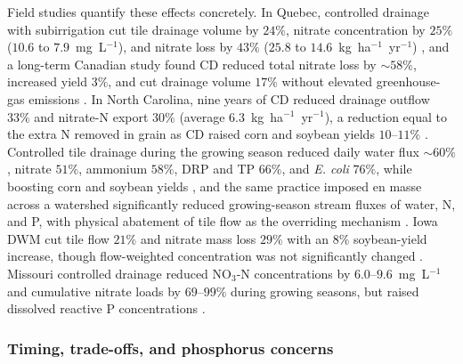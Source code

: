 \documentclass[11pt]{article}
\begin{document}
Field studies quantify these effects concretely. In Quebec, controlled
drainage with subirrigation cut tile drainage volume by $24\%$, nitrate
concentration by $25\%$ ($10.6$ to $7.9$~mg~L$^{-1}$), and nitrate loss by
$43\%$ ($25.8$ to $14.6$~kg~ha$^{-1}$~yr$^{-1}$) \parencite{Ng2000}, and a
long-term Canadian study found CD reduced total nitrate loss by $\sim58\%$,
increased yield $3\%$, and cut drainage volume $17\%$ without elevated
greenhouse-gas emissions \parencite{Madramootoo2024}. In North Carolina,
nine years of CD reduced drainage outflow $33\%$ and nitrate-N export
$30\%$ (average $6.3$~kg~ha$^{-1}$~yr$^{-1}$), a reduction equal to the
extra N removed in grain as CD raised corn and soybean yields $10$--$11\%$
\parencite{Poole2018}. Controlled tile drainage during the growing season
reduced daily water flux $\sim60\%$, nitrate $51\%$, ammonium $58\%$, DRP
and TP $66\%$, and \emph{E. coli} $76\%$, while boosting corn and soybean
yields \parencite{Sunohara2016}, and the same practice imposed en masse
across a watershed significantly reduced growing-season stream fluxes of
water, N, and P, with physical abatement of tile flow as the overriding
mechanism \parencite{Sunohara2015}. Iowa DWM cut tile flow $21\%$ and
nitrate mass loss $29\%$ with an $8\%$ soybean-yield increase, though
flow-weighted concentration was not significantly changed
\parencite{Jaynes2012}. Missouri controlled drainage reduced NO$_3$-N
concentrations by $6.0$--$9.6$~mg~L$^{-1}$ and cumulative nitrate loads by
$69$--$99\%$ during growing seasons, but raised dissolved reactive P
concentrations \parencite{Nash2020}.

\subsubsection{Timing, trade-offs, and phosphorus concerns}
\end{document}
